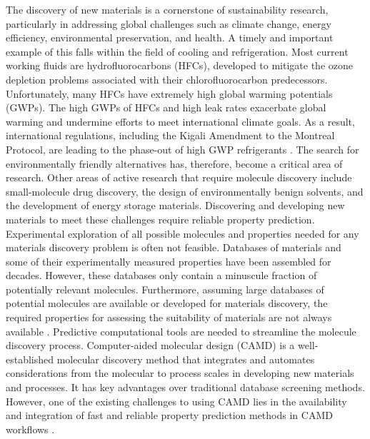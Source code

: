 \documentclass[journal=jacsat,manuscript=article, ]{achemso}
\begin{document}
The discovery of new materials is a cornerstone of sustainability research, particularly in addressing global challenges such as climate change, energy efficiency, environmental preservation, and health. 
A timely and important example of this falls within the field of cooling and refrigeration. 
Most current working fluids are hydrofluorocarbons (HFCs), developed to mitigate the ozone depletion problems associated with their chlorofluorocarbon predecessors. 
Unfortunately, many HFCs have extremely high global warming potentials (GWPs). 
The high GWPs of HFCs and high leak rates exacerbate global warming and undermine efforts to meet international climate goals. 
As a result, international regulations, including the Kigali Amendment to the Montreal Protocol, are leading to the phase-out of high GWP refrigerants \cite{departmentofecologystateofwashingtonHydrofluorocarbons2023, usaepaReducingHydrofluorocarbonHFC2014, davenportNationsFightingPowerful2016, mcgrathClimateChangeMonumental2016, veldersLargeContributionProjected2009}.  
The search for environmentally friendly alternatives has, therefore, become a critical area of research.
Other areas of active research that require molecule discovery include small-molecule drug discovery, the design of environmentally benign solvents, and the development of energy storage materials.
Discovering and developing new materials to meet these challenges require reliable property prediction. Experimental exploration of all possible molecules and properties needed for any materials discovery problem is often not feasible. Databases \cite{Kim2023, yaws-critical-property, bookRumble2023, Dortmund2024} of materials and some of their experimentally measured properties have been assembled for decades. However, these databases only contain a minuscule fraction of potentially relevant molecules. Furthermore, assuming large databases of potential molecules are available or developed for materials discovery, the required properties for assessing the suitability of materials are not always available \cite{mclindenLimitedOptionsLowglobalwarmingpotential2017}. Predictive computational tools are needed to streamline the molecule discovery process. 
Computer-aided molecular design (CAMD) is a well-established molecular discovery method that integrates and automates considerations from the molecular to process scales in developing new materials and processes. It has key advantages over traditional database screening methods.
However, one of the existing challenges to using CAMD lies in the availability and integration of fast and reliable property prediction methods in CAMD workflows \cite{adjimanProcessSystemsEngineering2021}. 
\end{document}
